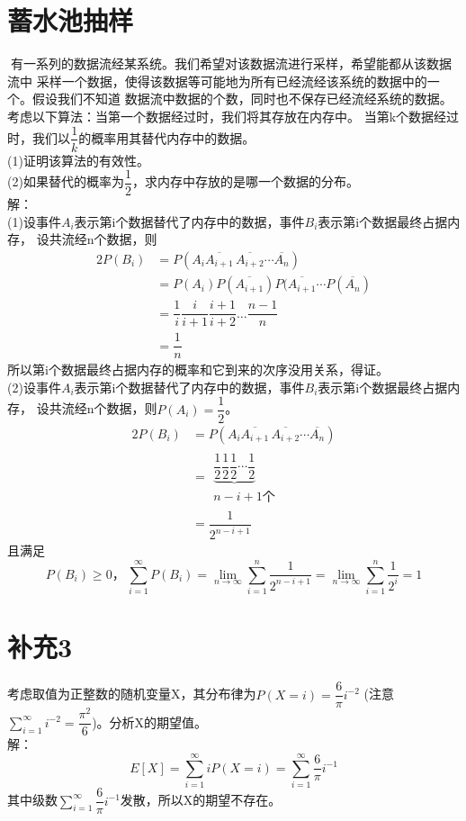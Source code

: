 \documentclass[a4papers]{ctexart}
\begin{document}
\section{蓄水池抽样}
有一系列的数据流经某系统。我们希望对该数据流进行采样，希望能都从该数据流中
采样一个数据，使得该数据等可能地为所有已经流经该系统的数据中的一个。假设我们不知道
数据流中数据的个数，同时也不保存已经流经系统的数据。\\
\indent 考虑以下算法：当第一个数据经过时，我们将其存放在内存中。
当第k个数据经过时，我们以$\dfrac{1}{k}$的概率用其替代内存中的数据。\\
(1)证明该算法的有效性。\\ 
(2)如果替代的概率为$\dfrac{1}{2}$，求内存中存放的是哪一个数据的分布。\\
\noindent 解：\\
(1)设事件$A_i$表示第i个数据替代了内存中的数据，事件$B_i$表示第i个数据最终占据内存，
设共流经n个数据，则
\begin{alignat*}{2}
    P(B_i)
    &=P(A_i \overline{A_{i+1}}\, \overline{A_{i+2}}\cdots\overline{A_n})\\
    &=P(A_i)P(\overline{A_{i+1}})P(\overline{A_{i+1}}\cdots P(\overline{A_n})\\
    &=\dfrac{1}{i} \dfrac{i}{i+1} \dfrac{i+1}{i+2}…\dfrac{n-1}{n}\\
    &=\dfrac{1}{n}
\end{alignat*}
所以第i个数据最终占据内存的概率和它到来的次序没用关系，得证。\\
(2)设事件$A_i$表示第i个数据替代了内存中的数据，事件$B_i$表示第i个数据最终占据内存，
设共流经n个数据，则$P(A_i)=\dfrac{1}{2}$。\\
\begin{alignat*}{2}
P(B_i)
&=P(A_i \overline{A_{i+1}}\, \overline{A_{i+2}}\cdots\overline{A_n})\\
&=\begin{matrix}\underbrace{\dfrac{1}{2} \dfrac{1}{2} \dfrac{1}{2} \cdots \dfrac{1}{2}}\\ n-i+1个 \end{matrix}\\
&=\dfrac{1}{2^{n-i+1}}
\end{alignat*}
且满足\[
    P(B_i)\ge 0，\,\sum_{i=1}^\infty P(B_i)
    =\lim_{n \to \infty}\sum_{i=1}^n \dfrac{1}{2^{n-i+1}} 
    =\lim_{n \to \infty}\sum_{i=1}^n \dfrac{1}{2^i} 
    = 1
\]
\section{补充3 }
考虑取值为正整数的随机变量X，其分布律为$P(X=i)=\dfrac{6}{\pi}i^{-2}$
(注意$\sum_{i=1}^\infty i^{-2}=\dfrac{\pi^2}{6}$)。分析X的期望值。\\
\noindent 解：\\
\[E[X]=\sum_{i=1}^\infty iP(X=i) = \sum_{i=1}^\infty \dfrac{6}{\pi}i^{-1}\]
\indent 其中级数$\sum_{i=1}^\infty\dfrac{6}{\pi}i^{-1}$发散，所以X的期望不存在。
\end{document}
